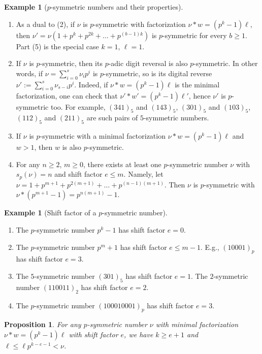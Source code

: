 \documentclass{amsart}
\numberwithin{equation}{section}
\theoremstyle{plain}
\newtheorem{proposition}[theorem]{Proposition}
\theoremstyle{definition}
\newtheorem{example}[theorem]{Example}
\begin{document}
\begin{example}[$p$-symmetric numbers and their properties]
\begin{enumerate}
    \item As a dual to (2), 
        if $\nu$ is $p$-symmetric with factorization $\nu * w = (p^k-1)\ell$,
    then 
    $\nu'=\nu(1 + p^k + p^{2k} + \dots + p^{(b-1)k})$
    is $p$-symmetric for every $b\ge 1$.
    Part (5) is the special case $k=1$, $\ell=1$.
\item If $\nu$ is $p$-symmetric, 
    then its $p$-adic digit reversal is also $p$-symmetric.
    In other words, if $\nu=\sum_{i=0}^{s}\nu_i p^i$ is $p$-symmetric,
    so is its digital reverse $\nu':=\sum_{i=0}^{s}\nu_{s-i}p^i$. Indeed, if $\nu*w=(p^k-1)\ell$ is the minimal factorization, one can check that
 $\nu'*w'=(p^k-1)\ell'$, hence $\nu'$ is $p$-symmetric too.
 For example, 
    $(341)_5$ and $(143)_5$, $(301)_5$ and $(103)_5$, $(112)_5$ and $(211)_5$
    are such pairs of $5$-symmetric numbers.

\item 
If $\nu$ is $p$-symmetric with a minimal factorization $\nu* w=(p^k-1)\ell$ and $w>1$, 
then $w$ is also $p$-symmetric.
 
\item For any $n \ge 2$, $m \ge 0$,
    there exists at least one $p$-symmetric number $\nu$
    with $s_p(\nu) = n$ and shift factor $e\le m$.
    Namely, let $\nu = 1 + p^{m+1} + p^{2(m+1)} + \dots + p^{(n-1)(m+1)}$.
    Then $\nu$ is $p$-symmetric with
    $\nu * (p^{m+1}-1) = p^{n(m+1)}-1$.
    \end{enumerate}
\end{example}

\begin{example}[Shift factor of a $p$-symmetric number]
\label{ex:shift_factor}
\-
\begin{enumerate} 
\item The $p$-symmetric number $p^k-1$ has shift factor $e=0$.
\item The $p$-symmetric number $p^m+1$ has shift factor $e\le m-1$. 
E.g., $(10001)_p$ has shift factor $e=3$.
\item The $5$-symmetric number $(301)_5$ has shift factor $e=1$.
The $2$-symmetric number $(110011)_2$ has shift factor $e=2$.
\item   
The $p$-symmetric number $(100010001)_p$ has shift factor $e=3$.
\end{enumerate}
\end{example}

\begin{proposition}\label{P:k-e}
For any $p$-symmetric number $\nu$ with minimal factorization \\
$\nu *w = (p^k-1)\ell$ with
shift factor $e$, we have $k\ge e+1$ and $\ell \le \ell p^{k-e-1}<\nu$.
\end{proposition}
\end{document}
